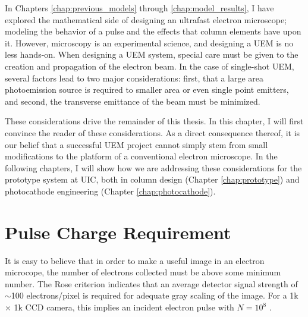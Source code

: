 
In Chapters \ref{chap:previous_models} through \ref{chap:model_results}, I have explored the mathematical side of designing an ultrafast electron microscope; modeling the behavior of a pulse and the effects that column elements have upon it.
However, microscopy is an experimental science, and designing a UEM is no less hands-on.
When designing a UEM system, special care must be given to the creation and propagation of the electron beam.
In the case of single-shot UEM, several factors lead to two major considerations: first, that a large area photoemission source is required to smaller area or even single point emitters, and second, the transverse emittance of the beam must be minimized.

These considerations drive the remainder of this thesis.
In this chapter, I will first convince the reader of these considerations.
As a direct consequence thereof, it is our belief that a successful UEM project cannot simply stem from small modifications to the platform of a conventional electron microscope.
In the following chapters, I will show how we are addressing these considerations for the prototype system at UIC, both in column design (Chapter \ref{chap:prototype}) and photocathode engineering (Chapter \ref{chap:photocathode}).

\section{Pulse Charge Requirement}

It is easy to believe that in order to make a useful image in an electron microcope, the number of electrons collected must be above some minimum number.
The Rose criterion \cite{rose_television_1948} indicates that an average detector signal strength of $\sim$100 electrons/pixel is required for adequate gray scaling of the image.
For a 1k $\times$ 1k CCD camera, this implies an incident electron pulse with $N=10^8$ \cite{armstrong_prospects_2007}.

